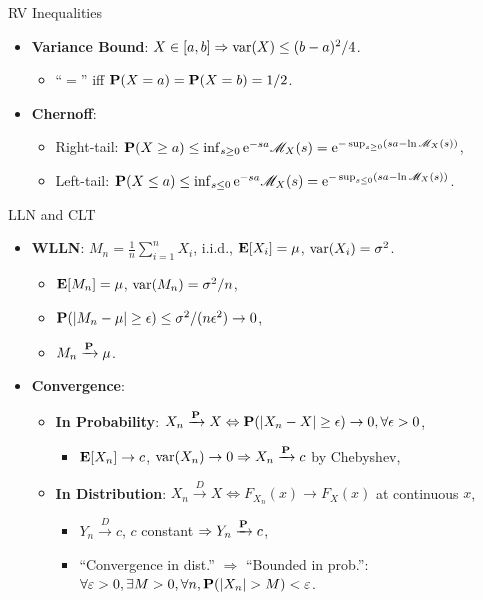 \documentclass[landscape,a4paper]{article}
\begin{document}
\begin{cheatsheetcolumns}
\begin{card}{RV Inequalities}
\begin{itemize}
\begin{itemize}
				\end{itemize}
				\item \textbf{Variance Bound}: $X\in[a,b]\Rightarrow\operatorname{var}(X)\le(b-a)^2/4$.
				\begin{itemize}
					\item ``$=$'' iff $\mathbf{P}(X=a)=\mathbf{P}(X=b)=1/2$.
				\end{itemize}
				\item \textbf{Chernoff}:
				\begin{itemize}
					\item Right-tail: $\mathbf{P}(X\ge a)\le \inf_{s\ge0}\mathrm{e}^{-sa}\mathscr{M}_X(s)=\mathrm{e}^{-\sup_{s\ge0}(sa-\ln\mathscr{M}_X(s))}$,
					\item Left-tail: $\mathbf{P}(X\le a)\le \inf_{s\le0}\mathrm{e}^{-sa}\mathscr{M}_X(s)=\mathrm{e}^{-\sup_{s\le0}(sa-\ln\mathscr{M}_X(s))}$.
				\end{itemize}
			\end{itemize}
		\end{card}
		\begin{card}{LLN and CLT}
			\begin{itemize}
				\item \textbf{WLLN}: $M_n=\frac{1}{n}\sum_{i=1}^nX_i$, i.i.d., $\mathbf{E}[X_i]=\mu$, $\operatorname{var}(X_i)=\sigma^2$.
				\begin{itemize}
					\item $\mathbf{E}[M_n]=\mu$, $\operatorname{var}(M_n)=\sigma^2/n$,
					\item $\mathbf{P}(|M_n-\mu|\ge\epsilon)\le\sigma^2/(n\epsilon^2)\to0$,
					\item $M_n\xrightarrow{\mathbf{P}}\mu$.
				\end{itemize}
				\item \textbf{Convergence}:
				\begin{itemize}
					\item \textbf{In Probability}: $X_n\xrightarrow{\mathbf{P}}X\Leftrightarrow \mathbf{P}(|X_n-X|\ge\epsilon)\to0,\forall\epsilon>0$,
					\begin{itemize}
						\item $\mathbf{E}[X_n]\to c$, $\operatorname{var}(X_n)\to0\Rightarrow X_n\xrightarrow{\mathbf{P}}c$ by Chebyshev,
					\end{itemize}
					\item \textbf{In Distribution}: $X_n\xrightarrow{D}X\Leftrightarrow F_{X_n}(x)\to F_X(x)$ at continuous $x$,
					\begin{itemize}
						\item $Y_n\xrightarrow{D}c$, $c$ constant $\Rightarrow Y_n\xrightarrow{\mathbf{P}}c$, 
						\item ``Convergence in dist.'' $\Rightarrow$ ``Bounded in prob.'':\\$\forall \varepsilon > 0, \exists M > 0, \forall n, \PP(|X_n|>M)<\varepsilon$. 

\end{itemize}
\end{itemize}
\end{itemize}
\end{card}
\end{cheatsheetcolumns}
\end{document}
